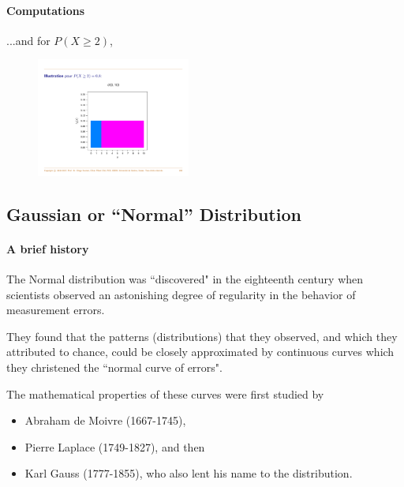 \documentclass[notes=show,smaller,handout]{beamer}\usepackage[]{graphicx}\usepackage[]{color}
\newenvironment{stepitemize}{\begin{itemize}[<+->]}{\end{itemize} }
\begin{document}
\begin{frame}{\subsecname}
  \framesubtitle{Computations}

  \begin{example}[continued]

  ...and for $P(X\geq 2)$,
  \begin{figure}[ptb]\centering
  \includegraphics[width=0.45\textwidth,height=0.55\textheight, angle= 0]{img/CDF_Diego.pdf}%
  \end{figure}
  \end{example}
\end{frame}

\subsection{Gaussian or ``Normal'' Distribution}

\begin{frame}{\subsecname}
\framesubtitle{A brief history}
  The Normal distribution was ``discovered" in the eighteenth
  century when scientists observed an astonishing degree of
  regularity in the behavior of measurement errors.

  \medskip

  They found that
  the patterns (distributions) that they observed, and which they
  attributed to chance, could be closely approximated by continuous
  curves which they christened the ``normal curve of errors".

  \medskip

  The mathematical properties of these curves were first studied by
  \begin{stepitemize}
  \item Abraham de Moivre (1667-1745),
  \item Pierre Laplace (1749-1827), and then
  \item Karl Gauss (1777-1855), who also lent his name to the
  distribution.
  \end{stepitemize}
\end{frame}
\end{document}

